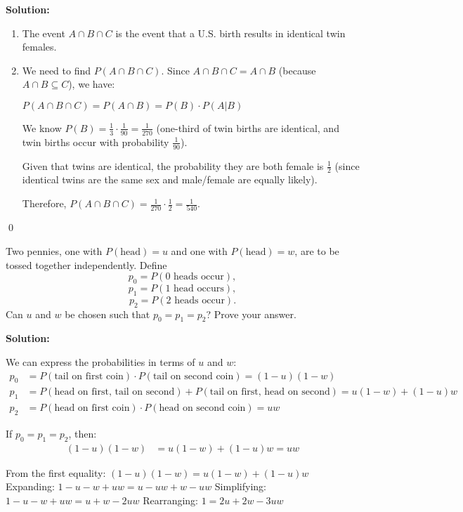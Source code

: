 \noindent\textbf{Solution:}
\begin{enumerate}[label=(\alph*)]
    \item The event $A \cap B \cap C$ is the event that a U.S. birth results in identical twin females.
    
    \item We need to find $P(A \cap B \cap C)$. Since $A \cap B \cap C = A \cap B$ (because $A \cap B \subseteq C$), we have:
    
    $P(A \cap B \cap C) = P(A \cap B) = P(B) \cdot P(A|B)$
    
    We know $P(B) = \frac{1}{3} \cdot \frac{1}{90} = \frac{1}{270}$ (one-third of twin births are identical, and twin births occur with probability $\frac{1}{90}$).
    
    Given that twins are identical, the probability they are both female is $\frac{1}{2}$ (since identical twins are the same sex and male/female are equally likely).
    
    Therefore, $P(A \cap B \cap C) = \frac{1}{270} \cdot \frac{1}{2} = \frac{1}{540}$.
\end{enumerate}



\qed
\begin{problembox}
Two pennies, one with $P(\text{head})=u$ and one with $P(\text{head})=w$, are to be tossed together independently. Define
\[ p_0 = P(0 \text{ heads occur}), \]
\[ p_1 = P(1 \text{ head occurs}), \]
\[ p_2 = P(2 \text{ heads occur}). \]
Can $u$ and $w$ be chosen such that $p_0 = p_1 = p_2$? Prove your answer.
\end{problembox}

\noindent\textbf{Solution:}

We can express the probabilities in terms of $u$ and $w$:
\begin{align*}
p_0 &= P(\text{tail on first coin}) \cdot P(\text{tail on second coin}) = (1-u)(1-w) \\
p_1 &= P(\text{head on first, tail on second}) + P(\text{tail on first, head on second}) = u(1-w) + (1-u)w \\
p_2 &= P(\text{head on first coin}) \cdot P(\text{head on second coin}) = uw
\end{align*}

If $p_0 = p_1 = p_2$, then:
\begin{align*}
(1-u)(1-w) &= u(1-w) + (1-u)w = uw
\end{align*}

From the first equality: $(1-u)(1-w) = u(1-w) + (1-u)w$
Expanding: $1 - u - w + uw = u - uw + w - uw$
Simplifying: $1 - u - w + uw = u + w - 2uw$
Rearranging: $1 = 2u + 2w - 3uw$

